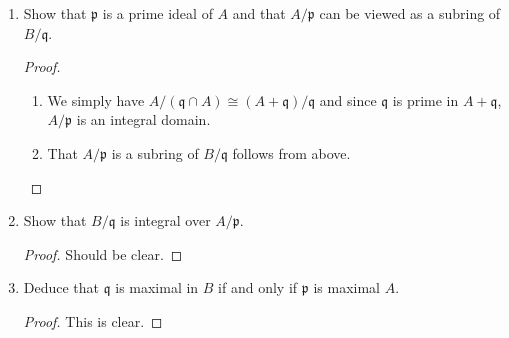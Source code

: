\documentclass[a4paper]{article}
\begin{document}
\begin{enumerate}
\begin{proof}
    For the other direction of the implication, we will do it traditionally. Let \(B\) be a field and fix an \(x \in A\). \(x\) is a unit in \(B\), so there is a \(y \in B\) with \(xy = 1\). Again, for \(y\) we have the expression
    \begin{align*}
      0 = a_0 + a_1 y + a_2 y^2 + \cdots + a_n y^n
    \end{align*}
    and if we multiply \(x^{n-1}\) on both sides, we yield
    \begin{align*}
      & 0 = a_0 x^{n-1} + a_1 x^{n-2} + a_2 x^{n-3} + a_n y \\
      \iff & -a_0 x^{n-1} - a_1 x^{n-2} - a_2 x^{n-3} =  a_n y \\
      \iff & a_n^{-1} (-a_0 x^{n-1} - a_1 x^{n-2} - a_2 x^{n-3}) = y
    \end{align*}
    In other words, \(y\) is in \(A\) or in different words, \(A\) is a field.
  \end{proof}
  \vspace*{250px}
  \item Show that \(\mathfrak{p}\) is a prime ideal of \(A\) and that \(A / \mathfrak{p}\) can be viewed as a subring of \(B / \mathfrak{q}\).
  \begin{proof}
    \begin{enumerate}
      \item We simply have \(A / (\mathfrak{q} \cap A) \cong (A + \mathfrak{q}) / \mathfrak{q}\) and since \(\mathfrak{q}\) is prime in \(A + \mathfrak{q}\), \(A / \mathfrak{p}\) is an integral domain.
      \item That \(A / \mathfrak{p}\) is a subring of \(B / \mathfrak{q}\) follows from above.
    \end{enumerate}
  \end{proof}
  \vspace*{250px}
  \item Show that \(B / \mathfrak{q}\) is integral over \(A / \mathfrak{p}\).
  \begin{proof}
    Should be clear.
  \end{proof}
  \vspace*{250px}
  \item Deduce that \(\mathfrak{q}\) is maximal in \(B\) if and only if \(\mathfrak{p}\) is maximal \(A\).
  \begin{proof}
    This is clear.
  \end{proof}
\end{enumerate}
\end{document}
